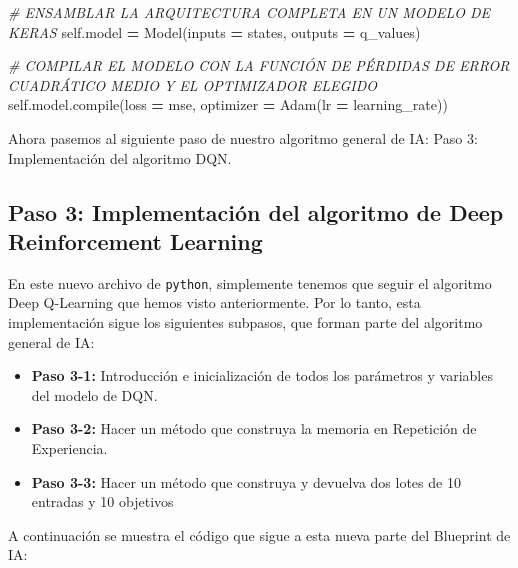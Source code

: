 \documentclass[
]{book}
\newenvironment{Shaded}{\begin{snugshade}}{\end{snugshade}}
\newcommand{\BuiltInTok}[1]{#1}
\newcommand{\CommentTok}[1]{\textcolor[rgb]{0.56,0.35,0.01}{\textit{#1}}}
\newcommand{\NormalTok}[1]{#1}
\newcommand{\OperatorTok}[1]{\textcolor[rgb]{0.81,0.36,0.00}{\textbf{#1}}}
\newcommand{\StringTok}[1]{\textcolor[rgb]{0.31,0.60,0.02}{#1}}
\newcommand{\VariableTok}[1]{\textcolor[rgb]{0.00,0.00,0.00}{#1}}
\providecommand{\tightlist}{%
  \setlength{\itemsep}{0pt}\setlength{\parskip}{0pt}}
\begin{document}
\begin{Shaded}
\begin{Highlighting}[]
        \CommentTok{\# ENSAMBLAR LA ARQUITECTURA COMPLETA EN UN MODELO DE KERAS}
        \VariableTok{self}\NormalTok{.model }\OperatorTok{=}\NormalTok{ Model(inputs }\OperatorTok{=}\NormalTok{ states, outputs }\OperatorTok{=}\NormalTok{ q\_values)}
        
        \CommentTok{\# COMPILAR EL MODELO CON LA FUNCIÓN DE PÉRDIDAS DE ERROR CUADRÁTICO MEDIO Y EL OPTIMIZADOR ELEGIDO}
        \VariableTok{self}\NormalTok{.model.}\BuiltInTok{compile}\NormalTok{(loss }\OperatorTok{=} \StringTok{\textquotesingle{}mse\textquotesingle{}}\NormalTok{, optimizer }\OperatorTok{=}\NormalTok{ Adam(lr }\OperatorTok{=}\NormalTok{ learning\_rate))}
\end{Highlighting}
\end{Shaded}

Ahora pasemos al siguiente paso de nuestro algoritmo general de IA: Paso 3: Implementación del algoritmo DQN.

\hypertarget{paso-3-implementaciuxf3n-del-algoritmo-de-deep-reinforcement-learning}{%
\subsection{Paso 3: Implementación del algoritmo de Deep Reinforcement Learning}\label{paso-3-implementaciuxf3n-del-algoritmo-de-deep-reinforcement-learning}}

En este nuevo archivo de \texttt{python}, simplemente tenemos que seguir el algoritmo Deep Q-Learning que hemos visto anteriormente. Por lo tanto, esta implementación sigue los siguientes subpasos, que forman parte del algoritmo general de IA:

\begin{itemize}
\tightlist
\item
  \textbf{Paso 3-1:} Introducción e inicialización de todos los parámetros y variables del modelo de DQN.
\item
  \textbf{Paso 3-2:} Hacer un método que construya la memoria en Repetición de Experiencia.
\item
  \textbf{Paso 3-3:} Hacer un método que construya y devuelva dos lotes de 10 entradas y 10 objetivos
\end{itemize}

A continuación se muestra el código que sigue a esta nueva parte del Blueprint de IA:
\end{document}
